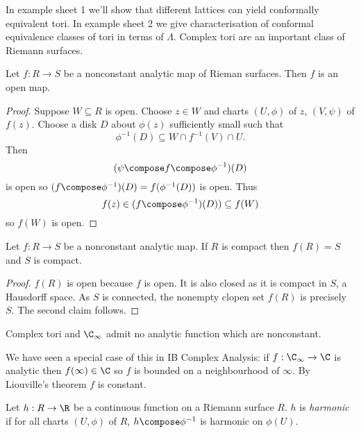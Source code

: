 \documentclass[a4paper]{article}
\begin{document}
In example sheet 1 we'll show that different lattices can yield conformally equivalent tori. In example sheet 2 we give characterisation of conformal equivalence classes of tori in terms of \(\Lambda\). Complex tori are an important class of Riemann surfaces.

\begin{theorem}
  Let \(f: R \to S\) be a nonconstant analytic map of Rieman surfaces. Then \(f\) is an open map.
\end{theorem}

\begin{proof}
  Suppose \(W \subseteq R\) is open. Choose \(z \in W\) and charts \((U, \phi)\) of \(z\), \((V, \psi)\) of \(f(z)\). Choose a disk \(D\) about \(\phi(z)\) sufficiently small such that
  \[
    \phi^{-1}(D) \subseteq W \cap f^{-1}(V) \cap U.
  \]
  Then
  \[
    (\psi \compose f \compose \phi^{-1})(D)
  \]
  is open so \((f \compose \phi^{-1})(D) = f(\phi^{-1}(D))\) is open. Thus
  \[
    f(z) \in (f \compose \phi^{-1})(D)) \subseteq f(W)
  \]
  so \(f(W)\) is open.
\end{proof}

\begin{corollary}
  Let \(f: R \to S\) be a nonconstant analytic map. If \(R\) is compact then \(f(R) = S\) and \(S\) is compact.
\end{corollary}

\begin{proof}
  \(f(R)\) is open because \(f\) is open. It is also closed as it is compact in \(S\), a Hausdorff space. As \(S\) is connected, the nonempty clopen set \(f(R)\) is precisely \(S\). The second claim follows.
\end{proof}

\begin{corollary}
  Complex tori and \(\C_\infty\) admit no analytic function which are nonconstant.
\end{corollary}

We have seen a special case of this in IB Complex Analysis: if \(f: \C_\infty \to \C\) is analytic then \(f(\infty) \in \C\) so \(f\) is bounded on a neighbourhood of \(\infty\). By Liouville's theorem \(f\) is constant.

\begin{definition}[harmonic]
  Let \(h: R \to \R\) be a continuous function on a Riemann surface \(R\). \(h\) is \emph{harmonic} if for all charts \((U, \phi)\) of \(R\), \(h \compose \phi^{-1}\) is harmonic on \(\phi(U)\).
\end{definition}
\end{document}
